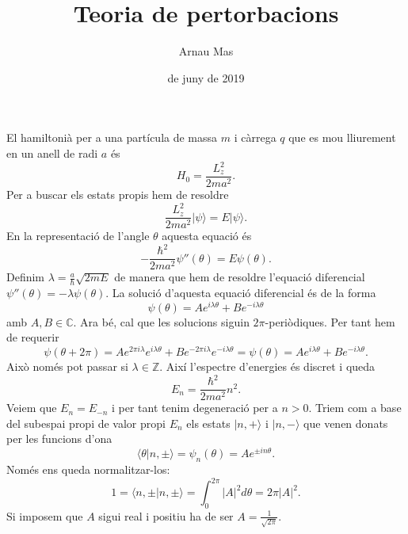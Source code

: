 \documentclass[12pt]{article}
\title{\sffamily {\bfseries Entrega 4:} Teoria de pertorbacions}
\author{\sffamily Arnau Mas}
\date{\sffamily 17 de juny de 2019}
\numberwithin{table}{section}
\numberwithin{figure}{section}
\newcommand{\Z}{\mathbb{Z}}
\newcommand{\C}{\mathbb{C}}
\newcommand{\abs}[1]{\lvert #1 \rvert}
\newcommand{\ket}[1]{\vert {#1} \rangle}
\newcommand{\braket}[2]{\langle {#1} \vert {#2} \rangle}
\begin{document}
\maketitle
El hamiltonià per a una partícula de massa \( m \) i càrrega \( q \) que es mou lliurement en un anell de radi \( a \) és
\begin{equation*}
	H_0 = \frac{L_z^2}{2ma^2}.
\end{equation*}
Per a buscar els estats propis hem de resoldre
\begin{equation*}
	\frac{L_z^2}{2ma^2}\ket{\psi} = E \ket{\psi}.
\end{equation*}
En la representació de l'angle \( \theta \) aquesta equació és
\begin{equation*}
	-\frac{\hbar^2}{2ma^2}\psi''(\theta) = E \psi(\theta).
\end{equation*}
Definim \( \lambda = \frac{a}{\hbar}\sqrt{2mE} \) de manera que hem de resoldre l'equació diferencial \( \psi''(\theta) = -\lambda \psi(\theta) \). La solució d'aquesta equació diferencial és de la forma
\begin{equation*}
	\psi(\theta) = Ae^{i\lambda\theta} + Be^{-i\lambda\theta}
\end{equation*}
amb \( A,B \in \C \). Ara bé, cal que les solucions siguin \( 2\pi \)-periòdiques. Per tant hem de requerir
\begin{equation*}
	\psi(\theta + 2\pi) = Ae^{2\pi i \lambda}e^{i\lambda\theta} + Be^{-2\pi i \lambda}e^{-i\lambda\theta} = \psi(\theta) = Ae^{i\lambda\theta} + Be^{-i\lambda\theta}.
\end{equation*}
Això només pot passar si \( \lambda \in \Z \). Així l'espectre d'energies és discret i queda
\begin{equation*}
	E_n = \frac{\hbar^2}{2ma^2}n^2.
\end{equation*}
Veiem que \( E_n = E_{-n} \) i per tant tenim degeneració per a \( n > 0 \). Triem com a base del subespai propi de valor propi \( E_n \) els estats \( \ket{n, +} \) i \( \ket{n, -} \) que venen donats per les funcions d'ona
\begin{equation*}
	\braket{\theta}{n, \pm} = \psi_n(\theta) = Ae^{\pm in\theta}.
\end{equation*}
Només ens queda normalitzar-los:
\begin{equation*}
 1 = \braket{n,\pm}{n,\pm} = \int_0^{2\pi} \abs{A}^2 d\theta = 2\pi\abs{A}^2.
\end{equation*}
Si imposem que \( A \) sigui real i positiu ha de ser \( A = \frac{1}{\sqrt{2\pi}} \). 
\end{document}
